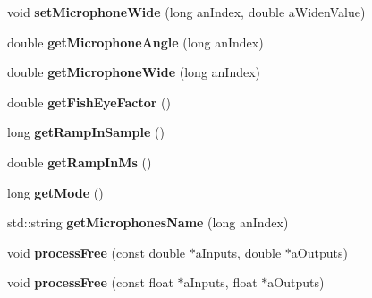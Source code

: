 \begin{DoxyCompactItemize}
\item 
\hypertarget{class_ambisonic_recomposer_a81c21c63fc58bba1686393cd34ce0eab}{void {\bfseries set\-Microphone\-Wide} (long an\-Index, double a\-Widen\-Value)}\label{class_ambisonic_recomposer_a81c21c63fc58bba1686393cd34ce0eab}

\item 
\hypertarget{class_ambisonic_recomposer_af188a0c47d165504b5143f7741c1c533}{double {\bfseries get\-Microphone\-Angle} (long an\-Index)}\label{class_ambisonic_recomposer_af188a0c47d165504b5143f7741c1c533}

\item 
\hypertarget{class_ambisonic_recomposer_ace83e5ad747a548b5cafa3bbd7b1085a}{double {\bfseries get\-Microphone\-Wide} (long an\-Index)}\label{class_ambisonic_recomposer_ace83e5ad747a548b5cafa3bbd7b1085a}

\item 
\hypertarget{class_ambisonic_recomposer_a7b9ac8691edc3effb9218e0d084a2b91}{double {\bfseries get\-Fish\-Eye\-Factor} ()}\label{class_ambisonic_recomposer_a7b9ac8691edc3effb9218e0d084a2b91}

\item 
\hypertarget{class_ambisonic_recomposer_a6a431691689fcf405590e7ed246d867a}{long {\bfseries get\-Ramp\-In\-Sample} ()}\label{class_ambisonic_recomposer_a6a431691689fcf405590e7ed246d867a}

\item 
\hypertarget{class_ambisonic_recomposer_a13af02ac2854ead480dd0c382faf9a0e}{double {\bfseries get\-Ramp\-In\-Ms} ()}\label{class_ambisonic_recomposer_a13af02ac2854ead480dd0c382faf9a0e}

\item 
\hypertarget{class_ambisonic_recomposer_a98f5c6a693ebe503dc44346a64418df3}{long {\bfseries get\-Mode} ()}\label{class_ambisonic_recomposer_a98f5c6a693ebe503dc44346a64418df3}

\item 
\hypertarget{class_ambisonic_recomposer_afdc771bd5bcbd86ba2e5b795d329b602}{std\-::string {\bfseries get\-Microphones\-Name} (long an\-Index)}\label{class_ambisonic_recomposer_afdc771bd5bcbd86ba2e5b795d329b602}

\item 
\hypertarget{class_ambisonic_recomposer_adef7946259e158c472ca2261b1047f0e}{void {\bfseries process\-Free} (const double $\ast$a\-Inputs, double $\ast$a\-Outputs)}\label{class_ambisonic_recomposer_adef7946259e158c472ca2261b1047f0e}

\item 
\hypertarget{class_ambisonic_recomposer_aed978825c04fa9df7dce312df0f3e91f}{void {\bfseries process\-Free} (const float $\ast$a\-Inputs, float $\ast$a\-Outputs)}\label{class_ambisonic_recomposer_aed978825c04fa9df7dce312df0f3e91f}


\end{DoxyCompactItemize}
